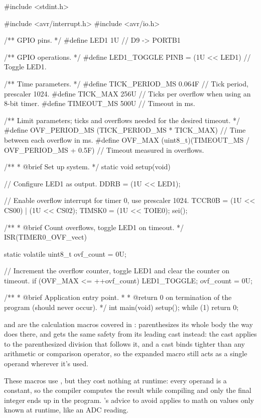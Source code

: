 \begin{ccode}
#include <stdint.h>

#include <avr/interrupt.h>
#include <avr/io.h>

/** GPIO pins. */
#define LED1 1U // D9 -> PORTB1

/** GPIO operations. */
#define LED1_TOGGLE PINB = (1U << LED1) // Toggle LED1.

/** Time parameters. */
#define TICK_PERIOD_MS 0.064F // Tick period, prescaler 1024.
#define TICK_MAX 256U         // Ticks per overflow when using an 8-bit timer.
#define TIMEOUT_MS 500U       // Timeout in ms.

/** Limit parameters; ticks and overflows needed for the desired timeout. */
#define OVF_PERIOD_MS (TICK_PERIOD_MS * TICK_MAX)            // Time between each overflow in ms.
#define OVF_MAX (uint8_t)(TIMEOUT_MS / OVF_PERIOD_MS + 0.5F) // Timeout measured in overflows.

/**
 * @brief Set up system.
 */
static void setup(void)
{
    // Configure LED1 as output.
    DDRB = (1U << LED1);

    // Enable overflow interrupt for timer 0, use prescaler 1024.
    TCCR0B = (1U << CS00) | (1U << CS02);
    TIMSK0 = (1U << TOIE0);
    sei();
}

/**
 * @brief Count overflows, toggle LED1 on timeout.
 */
ISR(TIMER0_OVF_vect)
{
    static volatile uint8_t ovf_count = 0U;

    // Increment the overflow counter, toggle LED1 and clear the counter on timeout.
    if (OVF_MAX <= ++ovf_count)
    {
        LED1_TOGGLE;
        ovf_count = 0U;
    }
}

/**
 * @brief Application entry point.
 *
 * @return 0 on termination of the program (should never occur).
 */
int main(void)
{
    setup();
    while (1) {}
    return 0;
}
\end{ccode}

 and  are the calculation macros covered in :
 parenthesizes its whole body the way  does there, and
 gets the same safety from its leading  cast instead: the cast
applies to the parenthesized division that follows it, and a cast binds tighter than any
arithmetic or comparison operator, so the expanded macro still acts as a single operand wherever
it's used.

These macros use , but they cost nothing at runtime: every operand is a constant, so the
compiler computes the result while compiling and only the final integer ends up in the program.
's advice to avoid  applies to math on values only known at runtime,
like an ADC reading.

